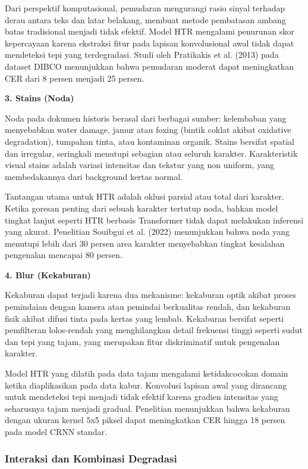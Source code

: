 \documentclass[12pt,a4paper]{article}
\begin{document}
Dari perspektif komputasional, pemudaran mengurangi rasio sinyal terhadap derau antara teks dan latar belakang, membuat metode pembatasan ambang batas tradisional menjadi tidak efektif. Model HTR mengalami penurunan skor kepercayaan karena ekstraksi fitur pada lapisan konvolusional awal tidak dapat mendeteksi tepi yang terdegradasi. Studi oleh Pratikakis et al. (2013) pada dataset DIBCO menunjukkan bahwa pemudaran moderat dapat meningkatkan CER dari 8 persen menjadi 25 persen.

\textbf{3. Stains (Noda)}

Noda pada dokumen historis berasal dari berbagai sumber: kelembaban yang menyebabkan water damage, jamur atau foxing (bintik coklat akibat oxidative degradation), tumpahan tinta, atau kontaminan organik. Stains bersifat spatial dan irregular, seringkali menutupi sebagian atau seluruh karakter. Karakteristik visual stains adalah variasi intensitas dan tekstur yang non uniform, yang membedakannya dari background kertas normal.

Tantangan utama untuk HTR adalah oklusi parsial atau total dari karakter. Ketika goresan penting dari sebuah karakter tertutup noda, bahkan model tingkat lanjut seperti HTR berbasis Transformer tidak dapat melakukan inferensi yang akurat. Penelitian Souibgui et al. (2022) menunjukkan bahwa noda yang menutupi lebih dari 30 persen area karakter menyebabkan tingkat kesalahan pengenalan mencapai 80 persen.

\textbf{4. Blur (Kekaburan)}

Kekaburan dapat terjadi karena dua mekanisme: kekaburan optik akibat proses pemindaian dengan kamera atau pemindai berkualitas rendah, dan kekaburan fisik akibat difusi tinta pada kertas yang lembab. Kekaburan bersifat seperti pemfilteran lolos-rendah yang menghilangkan detail frekuensi tinggi seperti sudut dan tepi yang tajam, yang merupakan fitur diskriminatif untuk pengenalan karakter.

Model HTR yang dilatih pada data tajam mengalami ketidakcocokan domain ketika diaplikasikan pada data kabur. Konvolusi lapisan awal yang dirancang untuk mendeteksi tepi menjadi tidak efektif karena gradien intensitas yang seharusnya tajam menjadi gradual. Penelitian menunjukkan bahwa kekaburan dengan ukuran kernel 5x5 piksel dapat meningkatkan CER hingga 18 persen pada model CRNN standar.

\subsubsection{Interaksi dan Kombinasi Degradasi}
\label{subsubsec:interaksi-degradasi}
\end{document}
